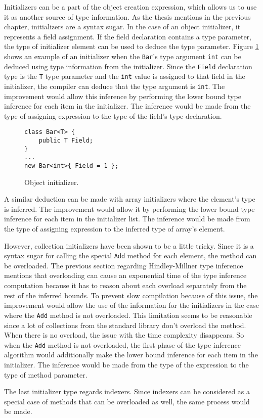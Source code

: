 Initializers can be a part of the object creation expression, which allows us to use it as another source of type information. 
As the thesis mentions in the previous chapter, initializers are a syntax sugar. 
In the case of an object initializer, it represents a field assignment. 
If the field declaration contains a type parameter, the type of initializer element can be used to deduce the type parameter. 
Figure \ref{img58:initializer} shows an example of an initializer when the \texttt{Bar}’s type argument \texttt{int} can be deduced using type information from the initializer. 
Since the \texttt{Field} declaration type is the \texttt{T} type parameter and the \texttt{int} value is assigned to that field in the initializer, the compiler can deduce that the type argument is \texttt{int}. 
The improvement would allow this inference by performing the lower bound type inference for each item in the initializer. 
The inference would be made from the type of assigning expression to the type of the field’s type declaration.
\begin{figure}[h!]
\begin{lstlisting}[style=csharp, mathescape=true]
class Bar<T> {
    public T Field;
}
...
new Bar<int>{ Field = 1 };
\end{lstlisting}
\caption{Object initializer.}
\label{img58:initializer}
\end{figure}
\par
A similar deduction can be made with array initializers where the element’s type is inferred.
The improvement would allow it by performing the lower bound type inference for each item in the initializer list. 
The inference would be made from the type of assigning expression to the inferred type of array’s element.
\par
However, collection initializers have been shown to be a little tricky. 
Since it is a syntax sugar for calling the special \texttt{Add} method for each element, the method can be overloaded. 
The previous section regarding Hindley-Millner type inference mentions that overloading can cause an exponential time of the type inference computation because it has to reason about each overload separately from the rest of the inferred bounds. 
To prevent slow compilation because of this issue, the improvement would allow the use of the information for the initializers in the case where the \texttt{Add} method is not overloaded. 
This limitation seems to be reasonable since a lot of collections from the standard library don’t overload the method. 
When there is no overload, the issue with the time complexity disappears. 
So when the \texttt{Add} method is not overloaded, the first phase of the type inference algorithm would additionally make the lower bound inference for each item in the initializer. 
The inference would be made from the type of the expression to the type of method parameter.
\par
The last initializer type regards indexers.
Since indexers can be considered as a special case of methods that can be overloaded as well, the same process would be made.

